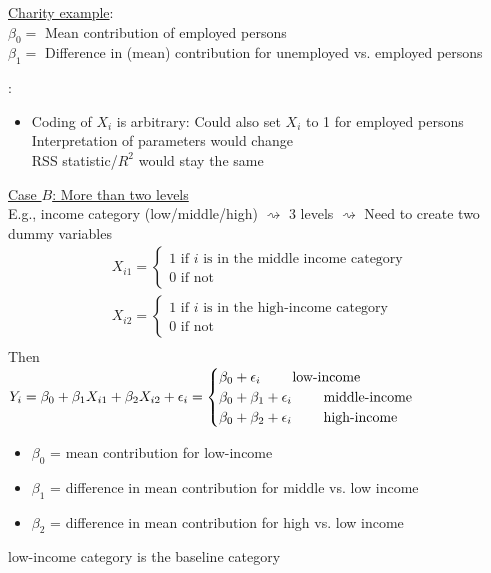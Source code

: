 \documentclass[11pt,a4paper,numbers=endperiod]{scrartcl}
\newcommand{\id}{\hspace*{4mm}}
\newcommand{\tit}[1]{\begin{large} \underline{\text{#1}}\end{large}}
\begin{document}
{\underline{Charity example}:\\
\id $\beta_0 =$ Mean contribution of employed persons\\
\id $\beta_1 =$ Difference in (mean) contribution for unemployed vs. employed persons\\
\newpage
\tit{Note}: \begin{itemize}
	\item Coding of $X_i$ is arbitrary: Could also set $X_i$ to 1 for employed persons\\
	\id {} Interpretation of parameters would change\\
	\id {} RSS statistic/$R^2$ would stay the same
\end{itemize}
\underline{Case $B$: More than two levels}\\
E.g., income category (low/middle/high) $\rightsquigarrow$ 3 levels $\rightsquigarrow$ Need to create two dummy variables \begin{align*}
	X_{i1} = \begin{cases}
	 1 \text{ if $i$ is in the middle income category}\\
	 0 \text{ if not}
	\end{cases}\\
	X_{i2} = \begin{cases}
	1 \text{ if $i$ is in the high-income category}\\
	0 \text{ if not}
	\end{cases}\\
\end{align*}
Then\\
$Y_i = \beta_0 + \beta_1 X_{i1} + \beta_2 X_{i2} + \epsilon_i = \begin{cases}
	\beta_0 + \epsilon_i \id \id \text{low-income}\\
	\beta_0 +  \beta_1 + \epsilon_i \id \id \text{middle-income}\\
	\beta_0 + \beta_2 + \epsilon_i \id \id \text{high-income}\\
\end{cases}$ \begin{itemize}
	\item $\beta_0$ = mean contribution for low-income
	\item $\beta_1$ = difference in mean contribution for middle vs. low income
	\item $\beta_2$ = difference in mean contribution for high vs. low income
\end{itemize}
\id low-income category is the baseline category\\

}
\end{document}
